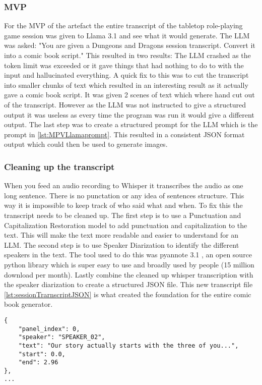 \subsubsection{MVP}
For the MVP of the artefact the entire transcript of the tabletop role-playing game session was given to Llama 3.1 and see what it would generate. The LLM was asked: "You are given a Dungeons and Dragons session transcript. Convert it into a comic book script." This resulted in two results: The LLM crashed as the token limit was exceeded or it gave things that had nothing to do to with the input and hallucinated everything. A quick fix to this was to cut the transcript into smaller chunks of text which resulted in an interesting result as it actually gave a comic book script. It was given 2 scenes of text which where hand cut out of the transcript. However as the LLM was not instructed to give a structured output it was useless as every time the program was run it would give a different output. The last step was to create a structured prompt for the LLM which is the prompt in \ref{lst:MPVLlamaprompt}. This resulted in a consistent JSON format output which could then be used to generate images.

\subsubsection{Cleaning up the transcript}
When you feed an audio recording to Whisper it transcribes the audio as one long sentence. There is no punctation or any idea of sentences structure. This way it is impossible to keep track of who said what and when. To fix this the transcript needs to be cleaned up. The first step is to use a Punctuation and Capitalization Restoration model \cite{guhrEtAl} to add punctuation and capitalization to the text. This will make the text more readable and easier to understand for an LLM. The second step is to use Speaker Diarization to identify the different speakers in the text. The tool used to do this was pyannote 3.1 \cite{Bredin23,Plaquet23}, an open source python library which is super easy to use and broadly used by people (15 million download per month). Lastly combine the cleaned up whisper transcription with the speaker diarization to create a structured JSON file. This new transcript file \ref{lst:sessionTrarnscriptJSON} is what created the foundation for the entire comic book generator.

\begin{lstlisting}[style=jsonstyle, caption={Session transcript JSON}, label={lst:sessionTrarnscriptJSON}]
{
    "panel_index": 0,
    "speaker": "SPEAKER_02",
    "text": "Our story actually starts with the three of you...",
    "start": 0.0,
    "end": 2.96
},
...
\end{lstlisting}

